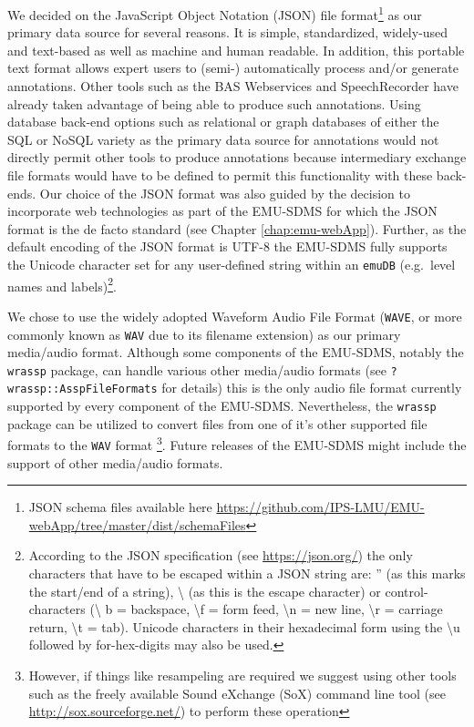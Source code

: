 \documentclass[]{book}
\let\rmarkdownfootnote\footnote%
\def\footnote{\protect\rmarkdownfootnote}
\theoremstyle{definition}
\theoremstyle{definition}
\theoremstyle{definition}
\theoremstyle{remark}
\begin{document}
We decided on the JavaScript Object Notation (JSON) file
format\footnote{JSON schema files available here
  \url{https://github.com/IPS-LMU/EMU-webApp/tree/master/dist/schemaFiles}}
as our primary data source for several reasons. It is simple,
standardized, widely-used and text-based as well as machine and human
readable. In addition, this portable text format allows expert users to
(semi-) automatically process and/or generate annotations. Other tools
such as the BAS Webservices \citep{kisler:2012a} and SpeechRecorder
\citep{draxler:2004a} have already taken advantage of being able to
produce such annotations. Using database back-end options such as
relational or graph databases of either the SQL or NoSQL variety as the
primary data source for annotations would not directly permit other
tools to produce annotations because intermediary exchange file formats
would have to be defined to permit this functionality with these
back-ends. Our choice of the JSON format was also guided by the decision
to incorporate web technologies as part of the EMU-SDMS for which the
JSON format is the de facto standard (see Chapter
\ref{chap:emu-webApp}). Further, as the default encoding of the JSON
format is UTF-8 the EMU-SDMS fully supports the Unicode character set
for any user-defined string within an \texttt{emuDB} (e.g.~level names
and labels)\footnote{According to the JSON specification (see
  \url{https://json.org/}) the only characters that have to be escaped
  within a JSON string are: '' (as this marks the start/end of a
  string), \textbackslash{} (as this is the escape character) or
  control-characters (\textbackslash{} b = backspace, \textbackslash{}f
  = form feed, \textbackslash{}n = new line, \textbackslash{}r =
  carriage return, \textbackslash{}t = tab). Unicode characters in their
  hexadecimal form using the \textbackslash{}u followed by
  for-hex-digits may also be used.}.

We chose to use the widely adopted Waveform Audio File Format
(\texttt{WAVE}, or more commonly known as \texttt{WAV} due to its
filename extension) as our primary media/audio format. Although some
components of the EMU-SDMS, notably the \texttt{wrassp} package, can
handle various other media/audio formats (see
\texttt{?wrassp::AsspFileFormats} for details) this is the only audio
file format currently supported by every component of the EMU-SDMS.
Nevertheless, the \texttt{wrassp} package can be utilized to convert
files from one of it's other supported file formats to the \texttt{WAV}
format \footnote{However, if things like resampeling are required we
  suggest using other tools such as the freely available Sound eXchange
  (SoX) command line tool (see \url{http://sox.sourceforge.net/}) to
  perform these operation}. Future releases of the EMU-SDMS might
include the support of other media/audio formats.
\end{document}

